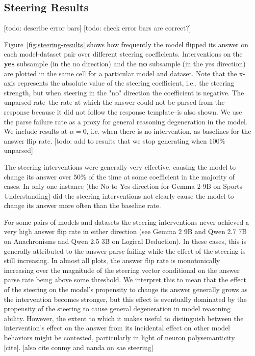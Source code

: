 \documentclass{article}
\begin{document}




\subsection{Steering Results}

[todo: describe error bars]
[todo: check error bars are correct?]

Figure~\ref{fig:steering-results} shows how frequently the model flipped its answer on each model-dataset pair over different steering coefficients. Interventions on the \textbf{yes} subsample (in the no direction) and the \textbf{no} subsample (in the yes direction) are plotted in the same cell for a particular model and dataset. Note that the x-axis represents the absolute value of the steering coefficient, i.e., the steering strength, but when steering in the "no" direction the coefficient is negative. The unparsed rate--the rate at which the answer could not be parsed from the response because it did not follow the response template--is also shown. We use the parse failure rate as a proxy for general reasoning degeneration in the model. We include results at $\alpha=0$, i.e. when there is no intervention, as baselines for the answer flip rate. [todo: add to results that we stop generating when 100\% unparsed]

The steering interventions were generally very effective, causing the model to change its answer over 50\% of the time at some coefficient in the majority of cases. In only one instance (the No to Yes direction for Gemma 2 9B on Sports Understanding) did the steering interventions not clearly cause the model to change its answer more often than the baseline rate.

For some pairs of models and datasets the steering interventions never achieved a very high answer flip rate in either direction (see Gemma 2 9B and Qwen 2.7 7B on Anachronisms and Qwen 2.5 3B on Logical Deduction). In these cases, this is generally attributed to the answer parse failing while the effect of the steering is still increasing. In almost all plots, the answer flip rate is monotonically increasing over the magnitude of the steering vector conditional on the answer parse rate being above some threshold. We interpret this to mean that the effect of the steering on the model's propensity to change its answer generally grows as the intervention becomes stronger, but this effect is eventually dominated by the propensity of the steering to cause general degeneration in model reasoning ability. However, the extent to which it makes useful to distinguish between the intervention's effect on the answer from its incidental effect on other model behaviors might be contested, particularly in light of neuron polysemanticity [cite]. [also cite conmy and nanda on sae steering]
\end{document}
